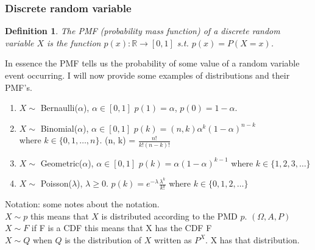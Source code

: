 \documentclass{article}
\newtheorem{definition}{Definition}
\newcommand{\R}{ \mathbb{R} }
\begin{document}
\subsubsection{Discrete random variable} 
\begin{definition}
    The PMF (probability mass function) of a discrete random variable $X$ is the function 
    $p(x) : \R \to [0,1]$ s.t. $p(x) = P(X=x)$.
\end{definition}
In essence the PMF tells us the probability of some value of a random variable event 
occurring. I will now provide some examples of distributions and their PMF's.
\begin{enumerate}
    \item $X \sim $ Bernaulli($\alpha$), $\alpha \in [0,1]$ $p(1) = \alpha$,  $p(0) = 1-\alpha$.
    \item $X \sim $ Binomial($\alpha$), $\alpha \in [0,1]$ $p(k) = (n, k)\alpha^k(1-\alpha)^{n-k}$ \\
        where $k \in  \{ 0, 1, \dots, n\} $. (n, k) = $\frac{n!}{k!(n-k)!}$
    \item $X \sim $ Geometric($\alpha$), $\alpha \in [0,1]$ $p(k) = \alpha(1-\alpha)^{k-1}$
        where $k \in \{ 1, 2, 3, \dots \} $
    \item $X \sim $ Poisson($\lambda$), $\lambda \ge 0$. $p(k) = e^{-\lambda}\frac{\lambda^k}{k!}$ 
        where $k \in  \{ 0, 1, 2, \dots\} $

\end{enumerate}
Notation: some notes about the notation. \\
$X \sim p$ this means that $X$ is distributed according to the PMD $p$.  $(\Omega, A, P)$ \\
$X \sim F$ if F is a CDF this means that X has the CDF F  \\
$X \sim Q$ when $Q$ is the distribution of $X$  written as $P^X$. X has that distribution. 
\end{document}
